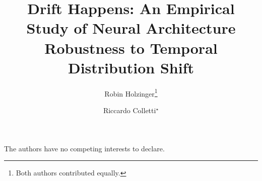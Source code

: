 \documentclass[runningheads]{llncs}
\begin{document}
\title{Drift Happens: An Empirical Study of Neural Architecture Robustness to Temporal Distribution Shift}
\newcommand{\equalcontribmark}{\texorpdfstring{\unskip$^\star$}{}}
\author{Robin Holzinger\thanks{Both authors contributed equally.} \and
Riccardo Colletti\equalcontribmark}

\maketitle

\begin{abstract}


\keywords{\abskeywords}
\end{abstract}








\begin{credits}
\subsubsection{\discintname}
The authors have no competing interests to declare.
\end{credits}


{\let\small\footnotesize }

\clearpage
\appendix





\end{document}
